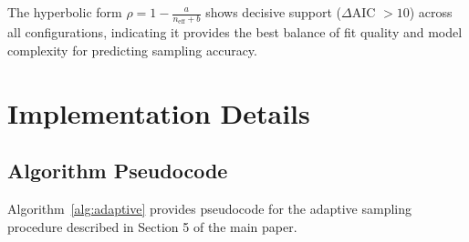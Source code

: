 \documentclass[11pt,a4paper]{article}
\newcommand{\effn}{\ensuremath{n_{\text{eff}}}}
\begin{document}


The hyperbolic form $\rho = 1 - \frac{a}{\effn + b}$ shows decisive support ($\Delta$AIC $> 10$) across all configurations, indicating it provides the best balance of fit quality and model complexity for predicting sampling accuracy.

\section{Implementation Details}
\label{sec:implementation}

\subsection{Algorithm Pseudocode}
\label{sec:pseudocode}

Algorithm~\ref{alg:adaptive} provides pseudocode for the adaptive sampling procedure described in Section 5 of the main paper.
\end{document}
